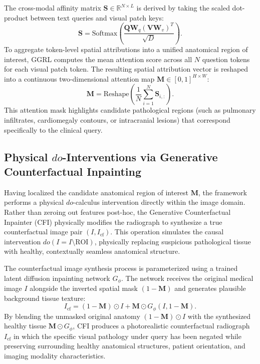 \documentclass[journal,twoside,web]{ieeecolor}
\begin{document}
The cross-modal affinity matrix $\mathbf{S} \in \mathbb{R}^{N \times L}$ is derived by taking the scaled dot-product between text queries and visual patch keys:
\begin{equation}
\mathbf{S} = \text{Softmax}\left(\frac{\mathbf{Q} \mathbf{W}_q (\mathbf{V} \mathbf{W}_v)^T}{\sqrt{D}}\right).
\label{eq:cross_attn}
\end{equation}
To aggregate token-level spatial attributions into a unified anatomical region of interest, GGRL computes the mean attention score across all $N$ question tokens for each visual patch token. The resulting spatial attribution vector is reshaped into a continuous two-dimensional attention map $\mathbf{M} \in [0, 1]^{H \times W}$:
\begin{equation}
\mathbf{M} = \text{Reshape}\left(\frac{1}{N} \sum_{i=1}^N \mathbf{S}_{i, :}\right).
\label{eq:spatial_mask}
\end{equation}
This attention mask highlights candidate pathological regions (such as pulmonary infiltrates, cardiomegaly contours, or intracranial lesions) that correspond specifically to the clinical query.

\subsection{Physical $do$-Interventions via Generative Counterfactual Inpainting}
Having localized the candidate anatomical region of interest $\mathbf{M}$, the framework performs a physical $do$-calculus intervention directly within the image domain. Rather than zeroing out features post-hoc, the Generative Counterfactual Inpainter (CFI) physically modifies the radiograph to synthesize a true counterfactual image pair $(I, I_{\text{cf}})$. This operation simulates the causal intervention $do(I = I \setminus \text{ROI})$, physically replacing suspicious pathological tissue with healthy, contextually seamless anatomical structure.

The counterfactual image synthesis process is parameterized using a trained latent diffusion inpainting network $G_{\phi}$. The network receives the original medical image $I$ alongside the inverted spatial mask $(1 - \mathbf{M})$ and generates plausible background tissue texture:
\begin{equation}
I_{\text{cf}} = (1 - \mathbf{M}) \odot I + \mathbf{M} \odot G_{\phi}(I, 1 - \mathbf{M}).
\label{eq:inpainting}
\end{equation}
By blending the unmasked original anatomy $(1 - \mathbf{M}) \odot I$ with the synthesized healthy tissue $\mathbf{M} \odot G_{\phi}$, CFI produces a photorealistic counterfactual radiograph $I_{\text{cf}}$ in which the specific visual pathology under query has been negated while preserving surrounding healthy anatomical structures, patient orientation, and imaging modality characteristics.
\end{document}
